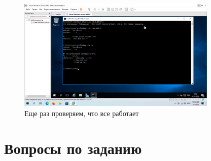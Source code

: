 \documentclass[a4paper]{article}
\begin{document}
  \begin{figure}[H]
    \centering
    \includegraphics[width=0.85\textwidth]{9_0100}
    \caption{Еще раз проверяем, что все работает}
    \label{img:0100}
  \end{figure}

  \section{Вопросы по заданию}
\end{document}
